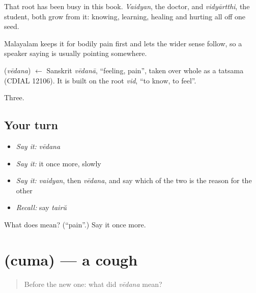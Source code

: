 That root has been busy in this book. \emph{Vaidyan}, the doctor, and \emph{vidyārtthi}, the student, both grow from it: knowing, learning, healing and hurting all off one seed.

Malayalam keeps it for bodily pain first and lets the wider sense follow, so a speaker saying  is usually pointing somewhere.

\begin{cousinweb}
\textbf{} (\emph{vēdana}) $\leftarrow$ Sanskrit \emph{vēdanā}, \textquotedblleft{}feeling, pain\textquotedblright{}, taken over whole as a tatsama (CDIAL 12106). It is built on the root \emph{vid}, \textquotedblleft{}to know, to feel\textquotedblright{}.
\end{cousinweb}

\begin{grammarlens}[title={What you've built}]
Three.
\end{grammarlens}

\subsection*{Your turn}
\begin{itemize}
\raggedright
  \item \emph{Say it:} \emph{vēdana}
  \item \emph{Say it:} it once more, slowly
  \item \emph{Say it:} \emph{vaidyan}, then \emph{vēdana}, and say which of the two is the reason for the other
  \item \emph{Recall:} say \emph{tairŭ}
\end{itemize}

\begin{tcolorbox}[breakable,colback=teal!4,colframe=teal!35!black,title={Before you move on}]
What does  mean? (\textquotedblleft{}pain\textquotedblright{}.) Say it once more.
\end{tcolorbox}
\section[\texorpdfstring{\ml{ചുമ} (cuma)}{ചുമ (cuma)}]{ (cuma) — a cough}

\label{lesson:ML-C63-cough}



\begin{quote}
Before the new one: what did \emph{vēdana} mean?
\end{quote}

